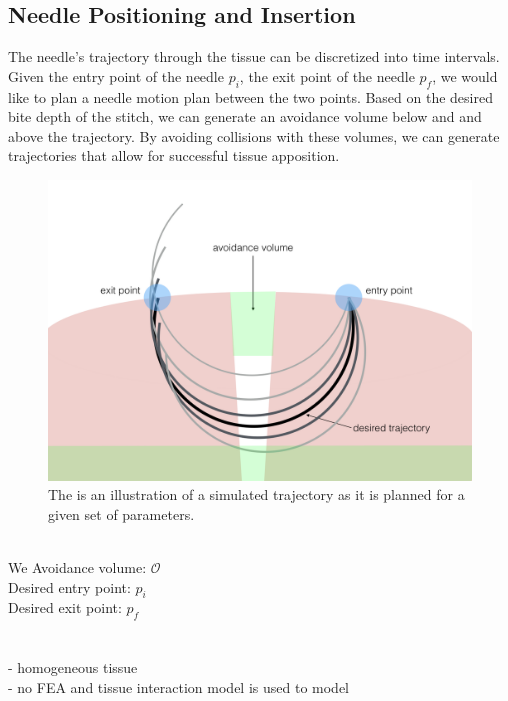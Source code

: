 \documentclass[0-suturing.tex]{subfiles}
\begin{document}
\subsection{Needle Positioning and Insertion}
The needle's trajectory through the tissue can be discretized into time intervals. Given the entry point of the needle $p_i$, the exit point of the needle $p_f$, we would like to plan a needle motion plan between the two points. Based on the desired bite depth of the stitch, we can generate an avoidance volume below and and above the trajectory. By avoiding collisions with these volumes, we can generate trajectories that allow for successful tissue apposition.



\begin{figure}[t]
\centering
\includegraphics[width=0.85\linewidth]{figures/problem_image.jpg}
\caption{ The is an illustration of a simulated trajectory as it is planned for a given set of parameters.}
\label{fig:toyEx}
\vspace{-15pt}
\end{figure}


\\
We 
Avoidance volume: $\mathcal{O}$ \\
Desired entry point: $p_i$ \\
Desired exit point: $p_f$ \\

\\


\\
- homogeneous tissue\\
- no FEA and tissue interaction model is used to model 
\end{document}
